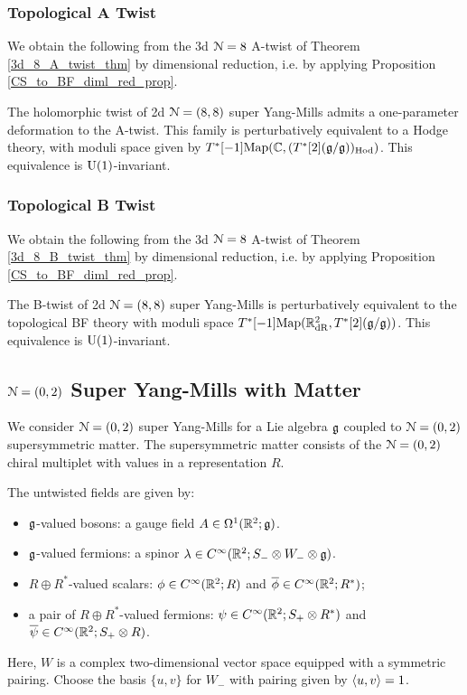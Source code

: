 \documentclass[10pt, oneside]{article}
\begin{document}
\subsubsection{Topological A Twist} \label{sect:2d88Atwist}
We obtain the following from the 3d $\mathcal{N}=8$ A-twist of Theorem \ref{3d_8_A_twist_thm} by dimensional reduction, i.e. by applying Proposition \ref{CS_to_BF_diml_red_prop}.

\begin{theorem}
The holomorphic twist of 2d $\mathcal{N}=(8,8)$ super Yang-Mills admits a one-parameter deformation to the A-twist.  This family is perturbatively equivalent to a Hodge theory, with moduli space given by $T^*[-1]\mathrm{Map}(\mathbb C, (T^*[2](\mathfrak{g} / \mathfrak{g}))_{\mathrm{Hod}})$.   This equivalence is $\mathrm{U}(1)$-invariant.
\end{theorem}

\subsubsection{Topological B Twist} \label{sect:2d88Btwist}
We obtain the following from the 3d $\mathcal{N}=8$ A-twist of Theorem \ref{3d_8_B_twist_thm} by dimensional reduction, i.e. by applying Proposition \ref{CS_to_BF_diml_red_prop}.

\begin{theorem}
The B-twist of 2d $\mathcal{N}=(8,8)$ super Yang-Mills is perturbatively equivalent to the topological BF theory with moduli space $T^*[-1]\mathrm{Map}(\mathbb R^2_{\mathrm{dR}}, T^*[2](\mathfrak{g} / \mathfrak{g}))$.  This equivalence is $\mathrm{U}(1)$-invariant.
\end{theorem}

\subsection{\texorpdfstring{$\mathcal N=(0,2)$}{N=(0,2)} Super Yang-Mills with Matter} \label{sect:2d(0,2)}

We consider $\mathcal N=(0,2)$ super Yang-Mills for a Lie algebra $\mathfrak g$ coupled to $\mathcal N=(0,2)$ supersymmetric matter. 
The supersymmetric matter consists of the $\mathcal N = (0,2)$ chiral multiplet with values in a representation $R$. 

The untwisted fields are given by:
\begin{itemize}
\item $\mathfrak g$-valued bosons: a gauge field $A \in \Omega^1(\mathbb R^2;\mathfrak g)$.
\item $\mathfrak g$-valued fermions: a spinor $\lambda \in C^\infty(\mathbb R^2 ; S_- \otimes W_- \otimes \mathfrak g)$. 
\item $R \oplus R^*$-valued scalars: $\phi \in C^\infty(\mathbb R^2 ; R)$ and $\overline{\phi} \in C^\infty(\mathbb R^2 ; R^*)$;
\item a pair of $R \oplus R^*$-valued fermions: $\psi \in C^\infty(\mathbb R^2 ; S_+ \otimes R^*)$  and $\overline{\psi} \in C^\infty(\mathbb R^2 ; S_+ \otimes R)$.
\end{itemize}
Here, $W$ is a complex two-dimensional vector space equipped with a symmetric pairing. 
Choose the basis $\{u,v\}$ for $W_-$ with pairing given by $\langle u, v\rangle = 1$. 
\end{document}
